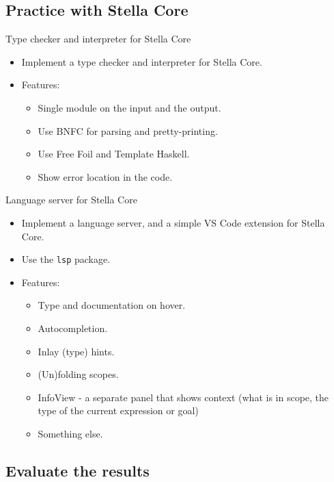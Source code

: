 \documentclass[serif, aspectratio=169]{beamer}
\let\oldcite\cite
\renewcommand{\cite}[2][]{\mbox{\oldcite[#1]{#2}}}
\begin{document}
\subsection{Practice with Stella Core}

\begin{frame}{Type checker and interpreter for Stella Core}
	\begin{itemize}
		\item Implement a type checker and interpreter for Stella Core.
		\item Features:
		      \begin{itemize}
			      \item Single module on the input and the output.
			      \item Use BNFC for parsing and pretty-printing.
			      \item Use Free Foil and Template Haskell.
			      \item Show error location in the code.
		      \end{itemize}
	\end{itemize}

\end{frame}

\begin{frame}{Language server for Stella Core}
	\begin{itemize}
		\item Implement a language server, and a simple VS Code extension for Stella Core.
		\item Use the \texttt{lsp} \cite{hackage-lsp} package.
		\item Features:
		      \begin{itemize}
			      \item Type and documentation on hover.
			      \item Autocompletion.
			      \item Inlay (type) hints.
			      \item (Un)folding scopes.
			      \item InfoView - a separate panel that shows context (what is in scope, the type of the current expression or goal)
			      \item Something else.
		      \end{itemize}
	\end{itemize}

\end{frame}

\subsection{Evaluate the results}
\end{document}
